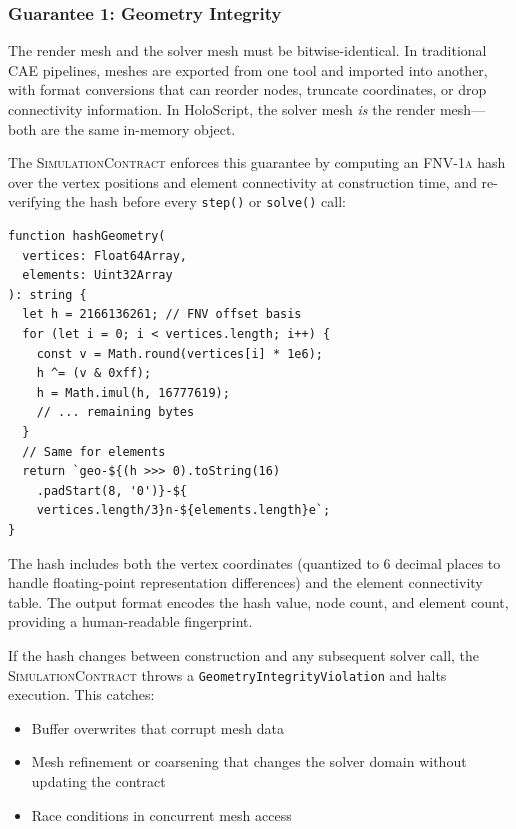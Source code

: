 \documentclass[letterpaper,twocolumn,10pt]{article}
\newcommand{\holoscript}{HoloScript}
\newcommand{\simcontract}{\textsc{SimulationContract}}
\newcommand{\fnvhash}{\textsc{FNV-1a}}
\begin{document}
\subsubsection{Guarantee 1: Geometry Integrity}

The render mesh and the solver mesh must be bitwise-identical. In
traditional CAE pipelines, meshes are exported from one tool and
imported into another, with format conversions that can reorder
nodes, truncate coordinates, or drop connectivity information. In
\holoscript{}, the solver mesh \emph{is} the render mesh---both are
the same in-memory object.

The \simcontract{} enforces this guarantee by computing an \fnvhash{}
hash over the vertex positions and element connectivity at construction
time, and re-verifying the hash before every \texttt{step()} or
\texttt{solve()} call:

\begin{lstlisting}[caption={Geometry integrity enforcement. The hash is computed at construction and verified before every solver invocation.}, label={lst:geohash}]
function hashGeometry(
  vertices: Float64Array,
  elements: Uint32Array
): string {
  let h = 2166136261; // FNV offset basis
  for (let i = 0; i < vertices.length; i++) {
    const v = Math.round(vertices[i] * 1e6);
    h ^= (v & 0xff);
    h = Math.imul(h, 16777619);
    // ... remaining bytes
  }
  // Same for elements
  return `geo-${(h >>> 0).toString(16)
    .padStart(8, '0')}-${
    vertices.length/3}n-${elements.length}e`;
}
\end{lstlisting}

The hash includes both the vertex coordinates (quantized to 6 decimal
places to handle floating-point representation differences) and the
element connectivity table. The output format encodes the hash value,
node count, and element count, providing a human-readable fingerprint.

If the hash changes between construction and any subsequent solver
call, the \simcontract{} throws a \texttt{GeometryIntegrityViolation}
and halts execution. This catches:
\begin{itemize}[leftmargin=*,topsep=2pt,itemsep=1pt]
  \item Buffer overwrites that corrupt mesh data
  \item Mesh refinement or coarsening that changes the solver domain
    without updating the contract
  \item Race conditions in concurrent mesh access
\end{itemize}
\end{document}
